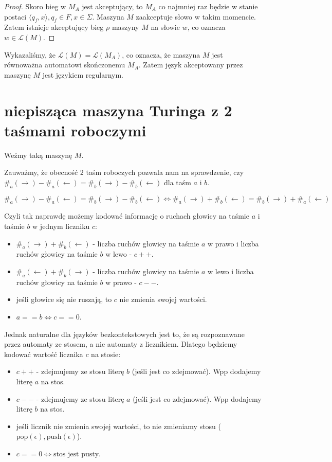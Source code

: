 \documentclass{article}
\theoremstyle{definition}
\theoremstyle{remark}
\begin{document}
\begin{proof}
Skoro bieg w \(M_A\) jest akceptujący, to \(M_A\) co najmniej raz będzie w stanie postaci \(\langle q_f, x \rangle, q_f \in F, x \in \Sigma\). Maszyna \(M\) zaakceptuje słowo w takim momencie.
Zatem istnieje akceptujący bieg $\rho$ maszyny $M$ na słowie $w$, co oznacza $w \in \mathcal{L}(M)$.
\end{proof}

Wykazaliśmy, że $\mathcal{L}(M) = \mathcal{L}(M_A)$, co oznacza, że maszyna $M$ jest równoważna automatowi skończonemu $M_A$.
Zatem język akceptowany przez maszynę $M$ jest językiem regularnym.

\section{niepisząca maszyna Turinga z 2 taśmami roboczymi}
Weźmy taką maszynę \(M\).

Zauważmy, że obecność 2 taśm roboczych pozwala nam na sprawdzenie, czy 
\( \#_{a}(\rightarrow) - \#_{a}(\leftarrow) = \#_{b}(\rightarrow) -  \#_{b}(\leftarrow) \) dla taśm \(a\) i \(b\).

\[ \#_{a}(\rightarrow) - \#_{a}(\leftarrow) = \#_{b}(\rightarrow) -  \#_{b}(\leftarrow) \iff  \#_{a}(\rightarrow) + \#_{b}(\leftarrow) = \#_{b}(\rightarrow) + \#_{a}(\leftarrow) \]

Czyli tak naprawdę możemy kodować informację o ruchach głowicy na taśmie \(a\) i taśmie \(b\) w jednym liczniku \(c\):
\begin{itemize}
\item \( \#_{a}(\rightarrow) + \#_{b}(\leftarrow) \) - liczba ruchów głowicy na taśmie \(a\) w prawo i liczba ruchów głowicy na taśmie \(b\) w lewo - \(c++\).
\item \( \#_{a}(\leftarrow) + \#_{b}(\rightarrow) \) - liczba ruchów głowicy na taśmie \(a\) w lewo i liczba ruchów głowicy na taśmie \(b\) w prawo - \(c--\).
\item jeśli głowice się nie ruszają, to \(c\) nie zmienia swojej wartości.
\item \(a == b \iff c == 0\).
\end{itemize}

Jednak naturalne dla języków bezkontekstowych jest to, że są rozpoznawane przez automaty ze stosem, a nie automaty z licznikiem.
Dlatego będziemy kodować wartość licznika \(c\) na stosie:
\begin{itemize}
\item \(c++\) - zdejmujemy ze stosu literę \(b\) (jeśli jest co zdejmować). Wpp dodajemy literę \(a\) na stos.
\item \(c--\) - zdejmujemy ze stosu literę \(a\) (jeśli jest co zdejmować). Wpp dodajemy literę \(b\) na stos.
\item jeśli licznik nie zmienia swojej wartości, to nie zmieniamy stosu (\(\text{pop}(\epsilon), \text{push}(\epsilon)\)).
\item \(c == 0 \iff \text{stos jest pusty}\).
\end{itemize}
\end{document}
